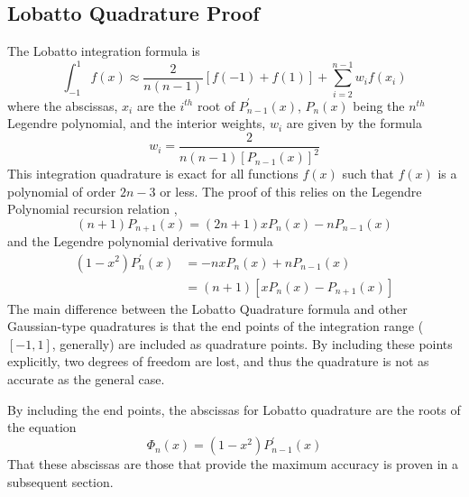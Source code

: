 \documentclass[preprint]{revtex4}
\newcommand{\intunit}{\ensuremath{\int_{-1}^{1}}}
\begin{document}
\subsection{Lobatto Quadrature Proof}
\label{lobattoproof}
The Lobatto integration formula is 
\begin{equation}
\label{lobatint_proof}
\intunit f(x) \approx \frac{2}{n(n-1)}\left[f(-1)+f(1)\right]+\sum_{i=2}^{n-1}w_if(x_i)
\end{equation}
where the abscissas, $x_i$ are the $i^{th}$ root of $P_{n-1}^\prime(x)$, $P_n(x)$ being the 
$n^{th}$ Legendre polynomial, and the interior weights, $w_i$ are given by the formula
\begin{equation}
\label{weightform}
w_i=\frac{2}{n(n-1)[P_{n-1}(x)]^2}
\end{equation}
This integration quadrature is exact for all functions $f(x)$ such that $f(x)$ is a
polynomial of order $2n-3$ or less. The proof of this relies on the Legendre Polynomial
recursion relation \cite{LegendrePoly},
\begin{equation}
\label{P3term}
(n+1)P_{n+1}(x)=(2n+1)xP_n(x)-nP_{n-1}(x) 
\end{equation}
and the Legendre polynomial derivative formula \cite{LegendrePoly}
\begin{align}
\label{P3der}
(1-x^2)P^\prime_{n}(x) &= -nxP_n(x)+nP_{n-1}(x) \\
  {}  &=(n+1)\left[xP_n(x)-P_{n+1}(x)\right]
\end{align}
The main difference between the Lobatto Quadrature formula and other Gaussian-type
quadratures is that the end points of the integration range ($[-1,1]$, generally) are
included as quadrature points. By including these points explicitly, two degrees 
of freedom are lost, and thus the quadrature is not as accurate as the general case. 

By including the end points, the abscissas for Lobatto quadrature are the roots
of the equation
\begin{equation}
\label{Phidef1}
\Phi_n(x)=(1-x^2)P_{n-1}^\prime(x)
\end{equation}
That these abscissas are those that provide the maximum accuracy is proven 
in a subsequent section. 
\end{document}
